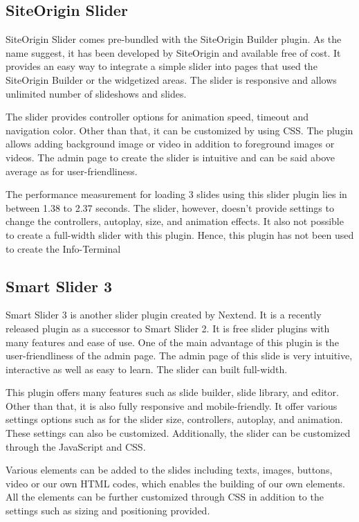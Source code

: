 \subsection{SiteOrigin Slider}
SiteOrigin Slider comes pre-bundled with the SiteOrigin Builder plugin. As the name suggest, it has been developed by SiteOrigin and available free of cost. It provides an easy way to integrate a simple slider into pages that used the SiteOrigin Builder or the widgetized areas. The slider is responsive and allows unlimited number of slideshows and slides.

The slider provides controller options for animation speed, timeout and navigation color. Other than that, it can be customized by using CSS. The plugin allows adding background image or video in addition to foreground images or videos. The admin page to create the slider is intuitive and can be said above average as for user-friendliness.

The performance measurement for loading 3 slides using this slider plugin lies in between 1.38 to 2.37 seconds. The slider, however, doesn't provide settings to change the controllers, autoplay, size, and animation effects. It also not possible to create a full-width slider with this plugin. Hence, this plugin has not been used to create the Info-Terminal

\subsection{Smart Slider 3}
Smart Slider 3 is another slider plugin created by Nextend. It is a recently released plugin as a successor to Smart Slider 2. It is free slider plugins with many features and ease of use. One of the main advantage of this plugin is the user-friendliness of the admin page. The admin page of this slide is very intuitive, interactive as well as easy to learn. The slider can built full-width.

This plugin offers many features such as slide builder, slide library, and editor. Other than that, it is also fully responsive and mobile-friendly. It offer various settings options such as for the slider size, controllers, autoplay, and animation. These settings can also be customized. Additionally, the slider can be customized through the JavaScript and CSS.

Various elements can be added to the slides including texts, images, buttons, video or our own HTML codes, which enables the building of our own elements. All the elements can be further customized through CSS in addition to the settings such as sizing and positioning provided.

